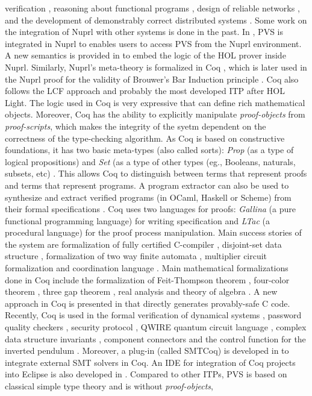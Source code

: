 verification , reasoning about functional programs , design of reliable
networks , and the development of demonstrably correct distributed systems .
Some work on the integration of Nuprl with other systems is done in the past. 
In , PVS is integrated in Nuprl to enables users to access PVS from the Nuprl environment. 
A new semantics is provided in  to embed the logic of the HOL prover inside Nuprl.
Similarly, Nuprl's meta-theory is formalized in Coq , which is later used in the Nuprl proof for the validity of Brouwer's Bar 
Induction principle .
Coq also follows the LCF approach and probably the most developed ITP after HOL Light. 
The logic used in Coq is very expressive that can define rich mathematical objects. 
Moreover, Coq has the ability to explicitly manipulate {\em proof-objects} from {\em proof-scripts}, 
which makes the integrity of the syetm dependent on the
correctness of the type-checking algorithm. As Coq is based on constructive foundations, it has two basic meta-types (also called sorts): {\em Prop} (as a type of 
logical propositions) and {\em Set} (as a type of other types (eg., Booleans, naturals, subsets, etc) .
This allows Coq to distinguish between terms that represent proofs and terms that represent programs.
A program extractor can also be used to synthesize and extract verified programs (in OCaml, Haskell or Scheme) from their formal specifications . 
Coq uses two languages for proofs: {\em Gallina} (a pure functional programming language) for writing specification and {\em LTac} (a procedural language)
for the proof process manipulation.
Main success stories of the system are formalization of fully certified C-compiler , 
disjoint-set data structure , formalization of two way finite automata , multiplier circuit 
formalization  and coordination language . Main mathematical formalizations done in Coq include the formalization of 
Feit-Thompson theorem , four-color theorem , three gap theorem , real analysis  and 
theory of algebra . 
A new approach in Coq is presented in  that directly generates provably-safe C code.
Recently, Coq is used in the formal verification of dynamical systems , password quality checkers , 
security protocol , QWIRE quantum circuit language , complex data structure invariants , 
component connectors  and the control function for the inverted pendulum .
Moreover, a plug-in (called  SMTCoq) is developed in  to integrate external SMT solvers in Coq.
An IDE for integration of Coq projects into Eclipse is also developed in . 
Compared to other ITPs, PVS is based on classical simple type theory and is without {\em proof-objects},
